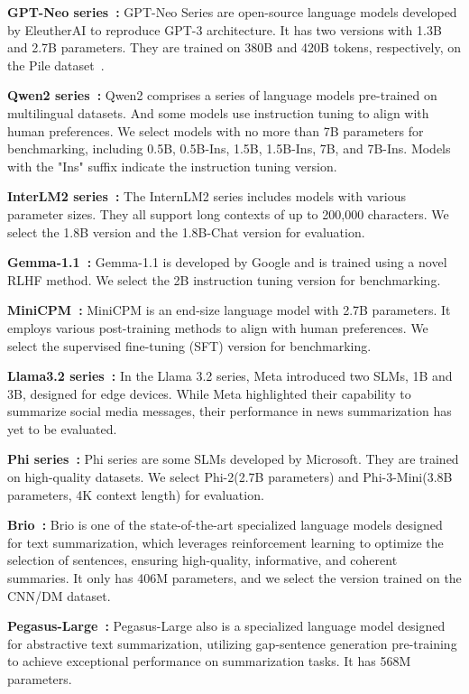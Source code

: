 \textbf{GPT-Neo series~\cite{gpt-neo}:} GPT-Neo Series are open-source language models developed by EleutherAI to reproduce GPT-3 architecture. It has two versions with 1.3B and 2.7B parameters. They are trained on 380B and 420B tokens, respectively, on the Pile dataset~\cite{gao2020pile,biderman2022datasheet_pile}.

\textbf{Qwen2 series~\cite{qwen}:} Qwen2 comprises a series of language models pre-trained on multilingual datasets. And some models use instruction tuning to align with human preferences. We select models with no more than 7B parameters for benchmarking, including 0.5B, 0.5B-Ins, 1.5B, 1.5B-Ins, 7B, and 7B-Ins. Models with the "Ins" suffix indicate the instruction tuning version.

\textbf{InterLM2 series~\cite{cai2024internlm2}:} The InternLM2 series includes models with various parameter sizes. They all support long contexts of up to 200,000 characters. We select the 1.8B version and the 1.8B-Chat version for evaluation.

\textbf{Gemma-1.1~\cite{team2024gemma}:} Gemma-1.1 is developed by Google and is trained using a novel RLHF method. We select the 2B instruction tuning version for benchmarking.

\textbf{MiniCPM~\cite{hu2024minicpm}:} MiniCPM is an end-size language model with 2.7B parameters. It employs various post-training methods to align with human preferences. We select the supervised fine-tuning (SFT) version for benchmarking.

\textbf{Llama3.2 series~\cite{llama3.2}:} In the Llama 3.2 series, Meta introduced two SLMs, 1B and 3B, designed for edge devices. While Meta highlighted their capability to summarize social media messages, their performance in news summarization has yet to be evaluated.


\textbf{Phi series~\cite{microsoft2023phi2,abdin2024phi3}:} Phi series are some SLMs developed by Microsoft. They are trained on high-quality datasets. We select Phi-2(2.7B parameters) and Phi-3-Mini(3.8B parameters, 4K context length) for evaluation. 

\textbf{Brio~\cite{brio}: } Brio is one of the state-of-the-art specialized language models designed for text summarization, which leverages reinforcement learning to optimize the selection of sentences, ensuring high-quality, informative, and coherent summaries. It only has 406M parameters, and we select the version trained on the CNN/DM dataset.

\textbf{Pegasus-Large~\cite{pegasus}:} Pegasus-Large also is a specialized language model designed for abstractive text summarization, utilizing gap-sentence generation pre-training to achieve exceptional performance on summarization tasks. It has 568M parameters.